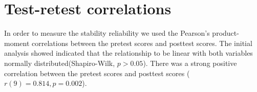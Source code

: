 \section{Test-retest correlations}\label{sec:testretest}
In order to measure the stability reliability we used the Pearson's product-moment correlations between the pretest scores and posttest scores. The initial analysis showed indicated that the relationship to be linear with both variables normally distributed(Shapiro-Wilk, $p > 0.05$). 
There was a strong positive correlation between the pretest scores and posttest scores ($r(9) = 0.814, p = 0.002$).

